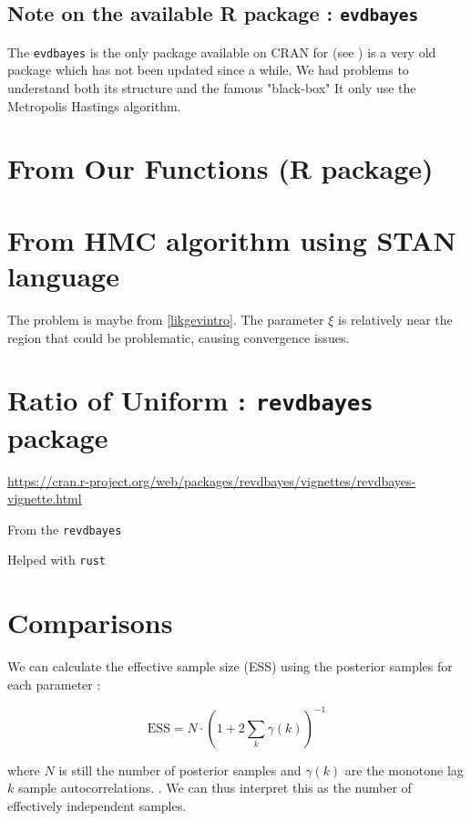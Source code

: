 \subsection*{Note on the available R package : \texttt{evdbayes}}

The \texttt{evdbayes} is the only package available on CRAN for (see \citet{ribatet_users_2006}) is a very old package which has not been updated since a while. We had problems to understand both its structure and the famous "black-box"
It only use the Metropolis Hastings algorithm.

\section{From Our Functions (R package)}



\section{From HMC algorithm using STAN language}

The problem is maybe from \ref{likgevintro}. The parameter $\xi$ is relatively near the region that could be problematic, causing convergence issues. 



\section{Ratio of Uniform : \texttt{revdbayes} package}

\url{https://cran.r-project.org/web/packages/revdbayes/vignettes/revdbayes-vignette.html}


From the \texttt{revdbayes}

Helped with \texttt{rust}
\section{Comparisons}

\citet{hartmann_bayesian_2016}
We can calculate the effective sample size (ESS) using the posterior samples for each parameter : 

\begin{equation}
\text{ESS}=N\cdot (1+2\sum_k\gamma(k))^{-1}
\end{equation}

where $N$ is still the number of posterior samples and $\gamma(k)$ are the monotone lag $k$ sample autocorrelations. \citet{geyer__1992}. We can thus interpret this as the number of effectively independent samples. 


